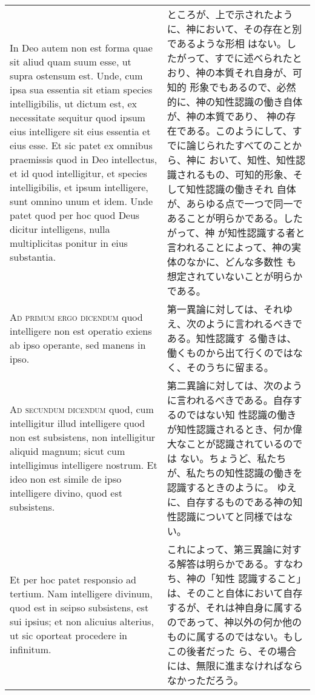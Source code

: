 \documentclass[10pt]{jsarticle} %
\begin{document}
\begin{longtable}{p{21em}p{21em}}
\\

In Deo autem non est forma quae sit aliud quam suum esse, ut supra
ostensum est.  Unde, cum ipsa sua essentia sit etiam species
intelligibilis, ut dictum est, ex necessitate sequitur quod ipsum eius
intelligere sit eius essentia et eius esse. Et sic patet ex omnibus
praemissis quod in Deo intellectus, et id quod intelligitur, et
species intelligibilis, et ipsum intelligere, sunt omnino unum et
idem. Unde patet quod per hoc quod Deus dicitur intelligens, nulla
multiplicitas ponitur in eius substantia.

&

ところが、上で示されたように、神において、その存在と別であるような形相
はない。したがって、すでに述べられたとおり、神の本質それ自身が、可知的
形象でもあるので、必然的に、神の知性認識の働き自体が、神の本質であり、
神の存在である。このようにして、すでに論じられたすべてのことから、神に
おいて、知性、知性認識されるもの、可知的形象、そして知性認識の働きそれ
自体が、あらゆる点で一つで同一であることが明らかである。したがって、神
が知性認識する者と言われることによって、神の実体のなかに、どんな多数性
も想定されていないことが明らかである。

\\


{\scshape Ad primum ergo dicendum} quod intelligere non est operatio
exiens ab ipso operante, sed manens in ipso.

&

第一異論に対しては、それゆえ、次のように言われるべきである。知性認識す
る働きは、働くものから出て行くのではなく、そのうちに留まる。


\\


{\scshape Ad secundum dicendum} quod, cum intelligitur illud
intelligere quod non est subsistens, non intelligitur aliquid magnum;
sicut cum intelligimus intelligere nostrum. Et ideo non est simile de
ipso intelligere divino, quod est subsistens.

&

第二異論に対しては、次のように言われるべきである。自存するのではない知
性認識の働きが知性認識されるとき、何か偉大なことが認識されているのでは
ない。ちょうど、私たちが、私たちの知性認識の働きを認識するときのように。
ゆえに、自存するものである神の知性認識についてと同様ではない。


\\


Et per hoc patet responsio ad tertium. Nam intelligere divinum, quod
est in seipso subsistens, est sui ipsius; et non alicuius alterius, ut
sic oporteat procedere in infinitum.

&

これによって、第三異論に対する解答は明らかである。すなわち、神の「知性
認識すること」は、そのこと自体において自存するが、それは神自身に属する
のであって、神以外の何か他のものに属するのではない。もしこの後者だった
ら、その場合には、無限に進まなければならなかっただろう。


\end{longtable}
\newpage
\end{document}
